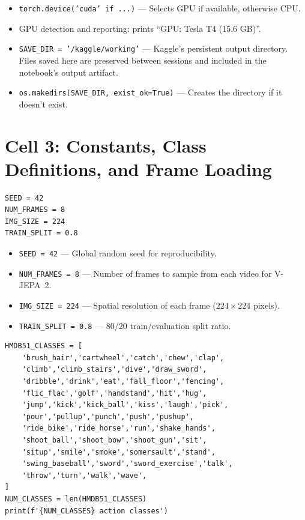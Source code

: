 \begin{explanation}
\begin{itemize}[nosep]
  \item \texttt{torch.device('cuda' if ...)} --- Selects GPU if available, otherwise CPU.
  \item GPU detection and reporting: prints ``GPU: Tesla T4 (15.6 GB)''.
  \item \texttt{SAVE\_DIR = '/kaggle/working'} --- Kaggle's persistent output directory. Files saved here are preserved between sessions and included in the notebook's output artifact.
  \item \texttt{os.makedirs(SAVE\_DIR, exist\_ok=True)} --- Creates the directory if it doesn't exist.
\end{itemize}
\end{explanation}

\newpage
\section{Cell 3: Constants, Class Definitions, and Frame Loading}

\begin{lstlisting}
SEED = 42
NUM_FRAMES = 8
IMG_SIZE = 224
TRAIN_SPLIT = 0.8
\end{lstlisting}

\begin{explanation}
\begin{itemize}[nosep]
  \item \texttt{SEED = 42} --- Global random seed for reproducibility.
  \item \texttt{NUM\_FRAMES = 8} --- Number of frames to sample from each video for V-JEPA~2.
  \item \texttt{IMG\_SIZE = 224} --- Spatial resolution of each frame ($224 \times 224$ pixels).
  \item \texttt{TRAIN\_SPLIT = 0.8} --- 80/20 train/evaluation split ratio.
\end{itemize}
\end{explanation}

\begin{lstlisting}
HMDB51_CLASSES = [
    'brush_hair','cartwheel','catch','chew','clap',
    'climb','climb_stairs','dive','draw_sword',
    'dribble','drink','eat','fall_floor','fencing',
    'flic_flac','golf','handstand','hit','hug',
    'jump','kick','kick_ball','kiss','laugh','pick',
    'pour','pullup','punch','push','pushup',
    'ride_bike','ride_horse','run','shake_hands',
    'shoot_ball','shoot_bow','shoot_gun','sit',
    'situp','smile','smoke','somersault','stand',
    'swing_baseball','sword','sword_exercise','talk',
    'throw','turn','walk','wave',
]
NUM_CLASSES = len(HMDB51_CLASSES)
print(f'{NUM_CLASSES} action classes')
\end{lstlisting}

